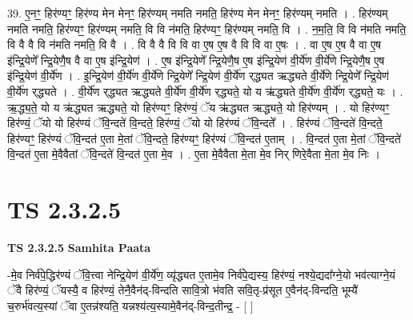 \documentclass[17pt]{extarticle}
\begin{document}
39. ए॒नꣳ॒॒ हिर॑ण्यꣳ॒॒ हिर॑ण्य मेन मेनꣳ॒॒ हिर॑ण्यम् नमति नमति॒ हिर॑ण्य मेन मेनꣳ॒॒ हिर॑ण्यम् नमति । . हिर॑ण्यम् नमति नमति॒ हिर॑ण्यꣳ॒॒ हिर॑ण्यम् नमति॒ वि वि न॑मति॒ हिर॑ण्यꣳ॒॒ हिर॑ण्यम् नमति॒ वि । . न॒म॒ति॒ वि वि न॑मति नमति॒ वि वै वै वि न॑मति नमति॒ वि वै । . वि वै वै वि वि वा ए॒ष ए॒ष वै वि वि वा ए॒षः । . वा ए॒ष ए॒ष वै वा ए॒ष इ॑न्द्रि॒येणे᳚ न्द्रि॒येणै॒ष वै वा ए॒ष इ॑न्द्रि॒येण॑ । . ए॒ष इ॑न्द्रि॒येणे᳚ न्द्रि॒येणै॒ष ए॒ष इ॑न्द्रि॒येण॑ वी॒र्ये॑ण वी॒र्ये॑णे न्द्रि॒येणै॒ष ए॒ष इ॑न्द्रि॒येण॑ वी॒र्ये॑ण । . इ॒न्द्रि॒येण॑ वी॒र्ये॑ण वी॒र्ये॑णे न्द्रि॒येणे᳚ न्द्रि॒येण॑ वी॒र्ये॑ण र्‌द्ध्यत ऋद्ध्यते वी॒र्ये॑णे न्द्रि॒येणे᳚ न्द्रि॒येण॑ वी॒र्ये॑ण र्‌द्ध्यते । . वी॒र्ये॑ण र्‌द्ध्यत ऋद्ध्यते वी॒र्ये॑ण वी॒र्ये॑ण र्‌द्ध्यते॒ यो य ऋ॑द्ध्यते वी॒र्ये॑ण वी॒र्ये॑ण र्‌द्ध्यते॒ यः । . ऋ॒द्ध्य॒ते॒ यो य ऋ॑द्ध्यत ऋद्ध्यते॒ यो हिर॑ण्यꣳ॒॒ हिर॑ण्यं॒ ॅय ऋ॑द्ध्यत ऋद्ध्यते॒ यो हिर॑ण्यम् । . यो हिर॑ण्यꣳ॒॒ हिर॑ण्यं॒ ॅयो यो हिर॑ण्यं ॅवि॒न्दते॑ वि॒न्दते॒ हिर॑ण्यं॒ ॅयो यो हिर॑ण्यं ॅवि॒न्दते᳚ । . हिर॑ण्यं ॅवि॒न्दते॑ वि॒न्दते॒ हिर॑ण्यꣳ॒॒ हिर॑ण्यं ॅवि॒न्दत॑ ए॒ता मे॒तां ॅवि॒न्दते॒ हिर॑ण्यꣳ॒॒ हिर॑ण्यं ॅवि॒न्दत॑ ए॒ताम् । . वि॒न्दत॑ ए॒ता मे॒तां ॅवि॒न्दते॑ वि॒न्दत॑ ए॒ता मे॒वैवैतां ॅवि॒न्दते॑ वि॒न्दत॑ ए॒ता मे॒व । . ए॒ता मे॒वैवैता मे॒ता मे॒व निर् णिरे॒वैता मे॒ता मे॒व निः । \newline
\pagebreak
{}
\section*{ TS 2.3.2.5 }

\textbf{TS 2.3.2.5 } \newline
\textbf{Samhita Paata} \newline

-मे॒व निर्व॑पे॒द्धिर॑ण्यं ॅवि॒त्त्वा नेन्द्रि॒येण॑ वी॒र्ये॑ण॒ व्यृ॑द्ध्यत ए॒तामे॒व निर्व॑पे॒द्यस्य॒ हिर॑ण्यं॒ नश्ये॒द्यदा᳚ग्ने॒यो भव॑त्याग्ने॒यं ॅवै हिर॑ण्यं॒ ॅयस्यै॒ व हिर॑ण्यं॒ तेनै॒वैन॑द्-विन्दति सावि॒त्रो भ॑वति सवि॒तृ-प्र॑सूत ए॒वैन॑द्-विन्दति॒ भूम्यै॑ च॒रुर्भ॑वत्य॒स्यां ॅवा ए॒तन्न॑श्यति॒ यन्नश्य॑त्य॒स्यामे॒वैन॑द्-विन्द॒तीन्द्र॒ - [  ] \newline
\end{document}
